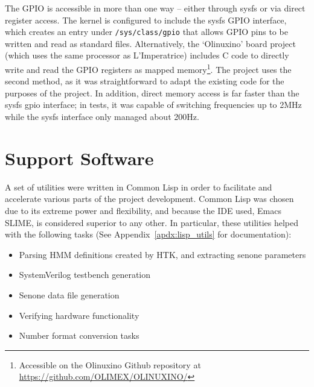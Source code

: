 		The GPIO is accessible in more than one way -- either through sysfs or via direct register access.  The kernel is configured to include the sysfs GPIO interface, which creates an entry under \texttt{/sys/class/gpio} that allows GPIO pins to be written and read as standard files.  Alternatively, the `Olinuxino' board project (which uses the same processor as L'Imperatrice) includes C code to directly write and read the GPIO registers as mapped memory\footnote{Accessible on the Olinuxino Github repository at \href{https://github.com/OLIMEX/OLINUXINO/}{https://github.com/OLIMEX/OLINUXINO/}}.  The project uses the second method, as it was straightforward to adapt the existing code for the purposes of the project.  In addition, direct memory access is far faster than the sysfs gpio interface; in tests, it was capable of switching frequencies up to 2MHz while the sysfs interface only managed about 200Hz.





\section{Support Software} %
\label{sec:support_software}
	A set of utilities were written in Common Lisp in order to facilitate and accelerate various parts of the project development.  Common Lisp was chosen due to its extreme power and flexibility, and because the IDE used, Emacs SLIME, is considered superior to any other.  In particular, these utilities helped with the following tasks (See Appendix~\ref{apdx:lisp_utils} for documentation):
	\begin{itemize}
		\item Parsing HMM definitions created by HTK, and extracting senone parameters
		\item SystemVerilog testbench generation
		\item Senone data file generation
		\item Verifying hardware functionality
		\item Number format conversion tasks
	\end{itemize}


